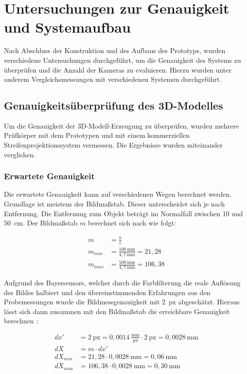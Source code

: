 \documentclass[./00PhotoBox.tex]{subfiles}
\begin{document}
\chapter{Untersuchungen zur Genauigkeit und Systemaufbau}
Nach Abschluss der Konstruktion und des Aufbaus des Prototyps, wurden verschiedene Untersuchungen durchgeführt, um die Genauigkeit des Systems zu überprüfen und die Anzahl der Kameras zu evaluieren. Hierzu wurden unter anderem Vergleichsmessungen mit verschiedenen Systemen durchgeführt.

\section{Genauigkeitsüberprüfung des 3D-Modelles}
Um die Genauigkeit der 3D-Modell-Erzeugung zu überprüfen, wurden mehrere Prüfkörper mit dem Prototypen und mit einem kommerziellen Streifenprojektionssystem vermessen. Die Ergebnisse wurden miteinander verglichen.

\subsection{Erwartete Genauigkeit}
Die erwartete Genauigkeit kann auf verschiedenen Wegen berechnet werden. Grundlage ist meistens der Bildmaßstab. Dieser unterscheidet sich je nach Entfernung. Die Entfernung zum Objekt beträgt im Normalfall zwischen 10 und 50~cm. Der Bildmaßstab $m$ berechnet sich nach \cite[S. 171]{luhmann} wie folgt:

\begin{align}
    m       & = \frac{h}{c}                                  \\
    m_{min} & = \frac{100~\text{mm}}{4,7~\text{mm}} = 21,28  \\
    m_{max} & = \frac{500~\text{mm}}{4,7~\text{mm}} = 106,38
\end{align}

Aufgrund des Bayersensors, welcher durch die Farbfilterung die reale Auflösung des Bildes halbiert und den übereinstimmenden Erfahrungen aus den Probemessungen wurde die Bildmessgenauigkeit mit 2~px abgeschätzt. Hieraus lässt sich dann zusammen mit den Bildmaßstab die erreichbare Genauigkeit berechnen \citep[S. 173]{luhmann}:

\begin{align}
    dx'      & = 2~\text{px} = 0,0014~\frac{\text{mm}}{\text{px}} \cdot 2~\text{px} = 0,0028~\text{mm} \\
    dX       & = m \cdot dx'                                                                           \\
    dX_{min} & = 21,28 \cdot 0,0028~\text{mm} = 0,06~\text{mm}                                         \\
    dX_{max} & = 106,38 \cdot 0,0028~\text{mm} = 0,30~\text{mm}
\end{align}
\end{document}
